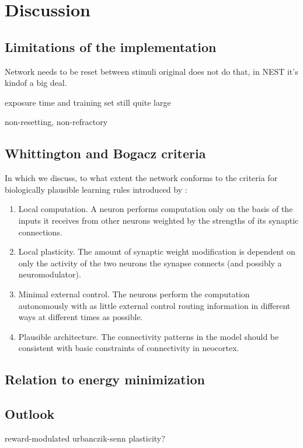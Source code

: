 
\chapter{Discussion}


\section{Limitations of the implementation}

Network needs to be reset between stimuli
original does not do that, in NEST it's kindof a big deal.

exposure time and training set still quite large

non-resetting, non-refractory


\section{Whittington and Bogacz criteria}

In which we discuss, to what extent the network conforms to the criteria for biologically plausible learning rules
introduced by \cite{Whittington2017}:
\begin{enumerate}
    \item Local computation. A neuron performs computation only on the basis
          of the inputs it receives from other neurons weighted by the strengths
          of its synaptic connections.
    \item  Local plasticity. The amount of synaptic weight modification is dependent on only the activity of the two
          neurons the synapse connects (and possibly a neuromodulator).
    \item  Minimal external control. The neurons perform the computation autonomously with as little external control
          routing information in different ways at different times as possible.
    \item   Plausible architecture. The connectivity patterns in the model should
          be consistent with basic constraints of connectivity in neocortex.
\end{enumerate}



\section{Relation to energy minimization}

\section{Outlook}

reward-modulated urbanczik-senn plasticity?

